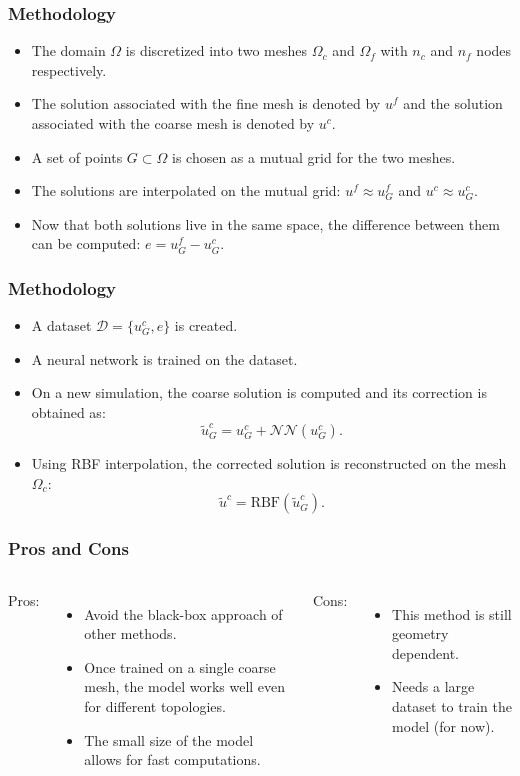 \documentclass{beamer}
\begin{document}
\begin{frame}
\frametitle{Methodology}
\begin{itemize}
    \item The domain \( \Omega \) is discretized into two meshes \( \Omega_c \) and \( \Omega_f \) with \( n_c \) and \( n_f \) nodes respectively. 
    \item The solution associated with the fine mesh is denoted by \( u^f \) and the solution associated with the coarse mesh is denoted by \( u^c \).
    \item A set of points \(G \subset \Omega\) is chosen as a mutual grid for the two meshes.
    \item The solutions are interpolated on the mutual grid: \( u^f \approx u^f_G \) and \( u^c \approx u^c_G \).
    \item Now that both solutions live in the same space, the difference between them can be computed: \( e = u^f_G - u^c_G \).
\end{itemize}
\end{frame}

\begin{frame}
\frametitle{Methodology}
\begin{itemize}
    \item A dataset \(\mathcal{D} = \{u_G^c, e\}\) is created.
    \item A neural network is trained on the dataset.
    \item On a new simulation, the coarse solution is computed and its correction is obtained as: 
    \[
        \tilde{u}_G^c = u_G^c + \mathcal{NN}(u_G^c).
    \]
    \item Using RBF interpolation, the corrected solution is reconstructed on the mesh \( \Omega_c \):
    \[
        \tilde{u}^c = \text{RBF}(\tilde{u}_G^c).
    \]
\end{itemize}
\end{frame}

\begin{frame}
\frametitle{Pros and Cons}
\begin{columns}
    Pros:
    \begin{itemize}
        \item Avoid the black-box approach of other methods.
        \item Once trained on a single coarse mesh, the model works well even for different topologies.
        \item The small size of the model allows for fast computations.
    \end{itemize}
    Cons:
    \begin{itemize}
        \item This method is still geometry dependent.
        \item Needs a large dataset to train the model (for now).
    \end{itemize}
\end{columns}
\end{frame}
\end{document}
